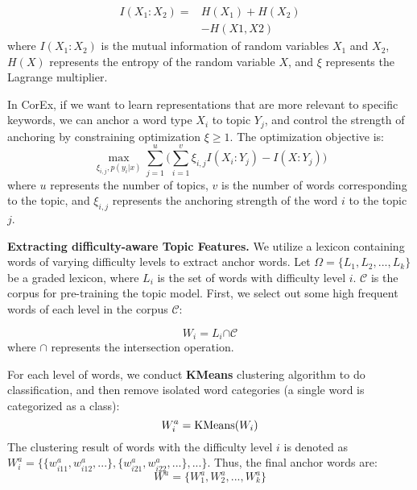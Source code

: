 \documentclass[11pt]{article}
\begin{document}
\begin{equation}
\begin{aligned}
I(X_1:X_2)= & H(X_1) + H(X_2) \\  
            & -H(X1,X2)
\end{aligned}
\end{equation}
where $I(X_1:X_2)$ is the mutual information of random variables $X_1$ and $X_2$, $H(X)$ represents the entropy of the random variable $X$, and $\xi$ represents the Lagrange multiplier.


In CorEx, if we want to learn representations that are more relevant to specific keywords, we can anchor a word type $X_i$ to topic $Y_j$, and control the strength of anchoring by constraining optimization $\xi\ge1$. The optimization objective is:
\begin{equation}
\mathop{max}\limits_{\xi_{i,j},p(y_i|x)}\sum\limits_{j=1}^u\Big(\sum\limits_{i=1}^v\xi_{i,j}I(X_i:Y_j)-I(X:Y_j)\Big)
\end{equation}
where $u$ represents the number of topics, $v$ is the number of words corresponding to the topic, and $\xi_{i,j}$ represents the anchoring strength of the word $i$ to the topic $j$.


\noindent\textbf{Extracting difficulty-aware Topic Features.}
We utilize a lexicon containing words of varying difficulty levels to extract anchor words. Let $\Omega=\{L_1,L_2,..., L_k\}$ be a graded lexicon, where $L_i$ is the set of words with difficulty level $i$. $\mathcal C$ is the corpus for pre-training the topic model. First, we select out some high frequent words of each level in the corpus $\mathcal C$:

\begin{equation}
W_i=L_i \bm{\cap} \mathcal C
\end{equation}
where $\bm{\cap}$ represents the intersection operation.

For each level of words, we conduct \textbf{KMeans} clustering algorithm to do classification, and then remove isolated word categories (a single word is categorized as a class):
\begin{equation}
W_i^a={\rm{KMeans}}(W_i)
\end{equation}
The clustering result of words with the difficulty level $i$ is denoted as $W_i^a=\{\{w_{i11}^a,w_{i12}^a, ...\}, \{w_{i21}^a,w_{i22}^a, ...\}, ...\}$. Thus, the final anchor words are:
\begin{equation}
W^a=\{W_1^a, W_2^a, ..., W_k^a\}
\end{equation}
\end{document}
